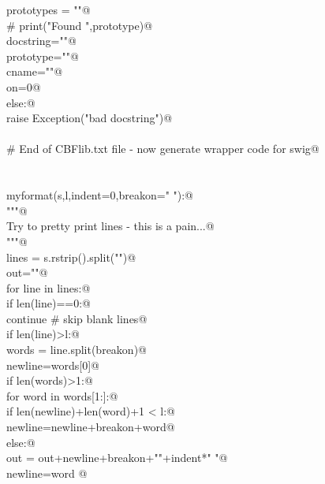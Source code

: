 \documentclass[10pt,a4paper,twoside,notitlepage]{article}
\begin{document}
\begin{flushleft}
\begin{minipage}{\linewidth}
\begin{list}{}{}
\mbox{}\verb@            prototypes = ""@\\
\mbox{}\verb@            # print("Found ",prototype)@\\
\mbox{}\verb@            docstring="\n"@\\
\mbox{}\verb@            prototype=""@\\
\mbox{}\verb@            cname=""@\\
\mbox{}\verb@            on=0@\\
\mbox{}\verb@         else:@\\
\mbox{}\verb@            raise Exception("bad docstring")@\\
\mbox{}\verb@@\\
\mbox{}\verb@# End of CBFlib.txt file - now generate wrapper code for swig@\\
\mbox{}\verb@@\\
\mbox{}\verb@@\\
\mbox{}\verb@def myformat(s,l,indent=0,breakon=" "):@\\
\mbox{}\verb@   """@\\
\mbox{}\verb@   Try to pretty print lines - this is a pain...@\\
\mbox{}\verb@   """@\\
\mbox{}\verb@   lines = s.rstrip().split("\n")@\\
\mbox{}\verb@   out=""@\\
\mbox{}\verb@   for line in lines:@\\
\mbox{}\verb@      if len(line)==0:@\\
\mbox{}\verb@         continue # skip blank lines@\\
\mbox{}\verb@      if len(line)>l:@\\
\mbox{}\verb@         words = line.split(breakon)@\\
\mbox{}\verb@         newline=words[0]@\\
\mbox{}\verb@         if len(words)>1:@\\
\mbox{}\verb@            for word in words[1:]:@\\
\mbox{}\verb@               if len(newline)+len(word)+1 < l:@\\
\mbox{}\verb@                  newline=newline+breakon+word@\\
\mbox{}\verb@               else:@\\
\mbox{}\verb@                  out = out+newline+breakon+"\n"+indent*" "@\\
\mbox{}\verb@                  newline=word       @\\

\end{list}
\end{minipage}
\end{flushleft}
\end{document}
